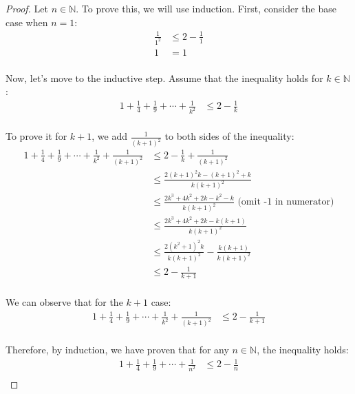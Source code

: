 \documentclass[12pt]{article}
\begin{document}
\begin{proof}
	Let $n \in \mathbb{N}$. To prove this, we will use induction. First, consider the base case when $n = 1$:
	$$
	\begin{aligned}
		\frac{1}{1^2} &\leq 2-\frac{1}{1}\\
		1 &=1\\
	\end{aligned}
	$$

    Now, let's move to the inductive step. Assume that the inequality holds for $k \in \mathbb{N}$:
    $$
    \begin{aligned}
            1+\frac{1}{4}+\frac{1}{9}+\cdots+\frac{1}{k^2} &\leq 2-\frac{1}{k}\\
    \end{aligned}
    $$

    To prove it for $k+1$, we add $\frac{1}{(k+1)^2}$ to both sides of the inequality:
    $$
    \begin{aligned}
            1+\frac{1}{4}+\frac{1}{9}+\cdots+\frac{1}{k^2}+\frac{1}{(k+1)^2} &\leq 2-\frac{1}{k}+\frac{1}{(k+1)^2}\\
                                                                             &\leq \frac{2(k+1)^2k - (k+1)^2 + k}{k(k+1)^2}\\
                                                                             &\leq \frac{2k^3+4k^2+2k-k^2-k}{k(k+1)^2}    \text{   (omit -1 in numerator)}\\
                                                                             &\leq \frac{2k^3+4k^2+2k-k(k+1)}{k(k+1)^2}\\
                                                                             &\leq \frac{2(k^2+1)^2k}{k(k+1)^2} - \frac{k(k+1)}{k(k+1)^2}\\
                                                                             &\leq 2 - \frac{1}{k+1}\\
    \end{aligned}
    $$

    We can observe that for the $k+1$ case:
    $$
    \begin{aligned}
            1+\frac{1}{4}+\frac{1}{9}+\cdots+\frac{1}{k^2}+\frac{1}{(k+1)^2} &\leq 2-\frac{1}{k+1}\\
    \end{aligned}
    $$

    Therefore, by induction, we have proven that for any $n \in \mathbb{N}$, the inequality holds:
    $$
    \begin{aligned}
            1+\frac{1}{4}+\frac{1}{9}+\cdots+\frac{1}{n^2} &\leq 2-\frac{1}{n}\\
    \end{aligned}
    $$
\end{proof}
\end{document}
